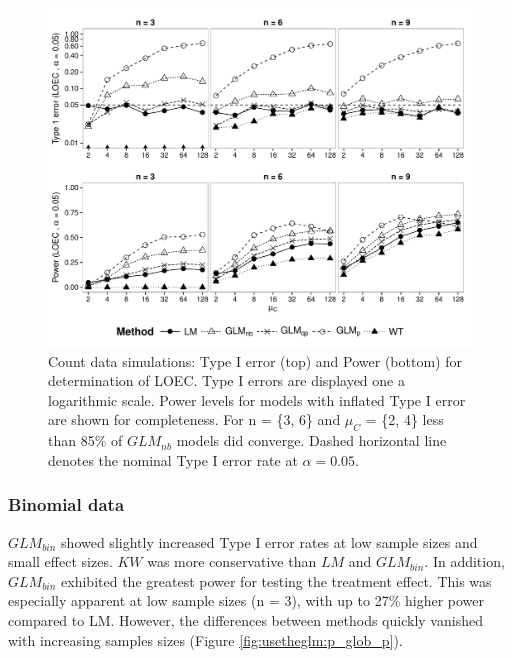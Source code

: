 \begin{figure}
  \centering
  \includegraphics[width = \textwidth]{chapters/usetheglm/p_loec_c.pdf}
  \caption[Count data simulations: Type I error (top) and Power (bottom) for determination of LOEC.]{Count data simulations: Type I error (top) and Power (bottom) for determination of LOEC.
  Type I errors are displayed one a logarithmic scale.
  Power levels for models with inflated Type I error are shown for completeness.
  For n = \{3, 6\} and $\mu_C$ = \{2, 4\} less than 85\% of $GLM_{nb}$ models did converge.
  Dashed horizontal line denotes the nominal Type I error rate at $\alpha = 0.05$.
  }
  \label{fig:usetheglm:p_loec_c}
\end{figure}


\subsubsection{Binomial data}
$GLM_{bin}$ showed slightly increased Type I error rates at low sample sizes and small effect sizes.
$KW$ was more conservative than $LM$ and $GLM_{bin}$.
In addition, $GLM_{bin}$ exhibited the greatest power for testing the treatment effect. 
This was especially apparent at low sample sizes (n = 3), with up to 27\% higher power compared to LM.
However, the differences between methods quickly vanished with increasing samples sizes (Figure \ref{fig:usetheglm:p_glob_p}).

